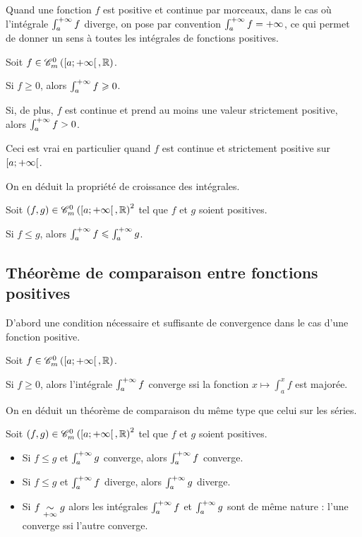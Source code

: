 Quand une fonction \(f\) est positive et continue par morceaux, dans le cas où l'intégrale \(\int_a^{+\infty}f\) diverge, on pose par convention \(\int_a^{+\infty}f=+\infty\), ce qui permet de donner un sens à toutes les intégrales de fonctions positives.

\begin{prop}
Soit \(f\in\contm[\intervie{a}{\pinf}][\R]\).

Si \(f\geq0\), alors \(\int_a^{+\infty}f\geqslant0\).

Si, de plus, \(f\) est continue et prend au moins une valeur strictement positive, alors \(\int_a^{+\infty}f>0\).

Ceci est vrai en particulier quand \(f\) est continue et strictement positive sur \(\left[a;+\infty\right[\).
\end{prop}

On en déduit la propriété de croissance des intégrales.

\begin{prop}
Soit \(\paren{f,g}\in\contm[\intervie{a}{\pinf}][\R]^2\) tel que \(f\) et \(g\) soient positives.

Si \(f\leq g\), alors \(\int_a^{+\infty}f\leqslant\int_a^{+\infty}g\).
\end{prop}

\subsection{Théorème de comparaison entre fonctions positives}

D'abord une condition nécessaire et suffisante de convergence dans le cas d'une fonction positive.

\begin{prop}
Soit \(f\in\contm[\intervie{a}{\pinf}][\R]\).

Si \(f\geq0\), alors l'intégrale \(\int_a^{+\infty}f\) converge ssi la fonction \(x\mapsto\int_a^xf\) est majorée.
\end{prop}

On en déduit un théorème de comparaison du même type que celui sur les séries.

\begin{theo}
Soit \(\paren{f,g}\in\contm[\intervie{a}{\pinf}][\R]^2\) tel que \(f\) et \(g\) soient positives.

\begin{itemize}
    \item Si \(f\leq g\) et \(\int_a^{+\infty}g\) converge, alors \(\int_a^{+\infty}f\) converge. \\
    \item Si \(f\leq g\) et \(\int_a^{+\infty}f\) diverge, alors \(\int_a^{+\infty}g\) diverge. \\
    \item Si \(f\underset{+\infty}{\sim}g\) alors les intégrales \(\int_a^{+\infty}f\) et \(\int_a^{+\infty}g\) sont de même nature : l'une converge ssi l'autre converge.
\end{itemize}
\end{theo}

